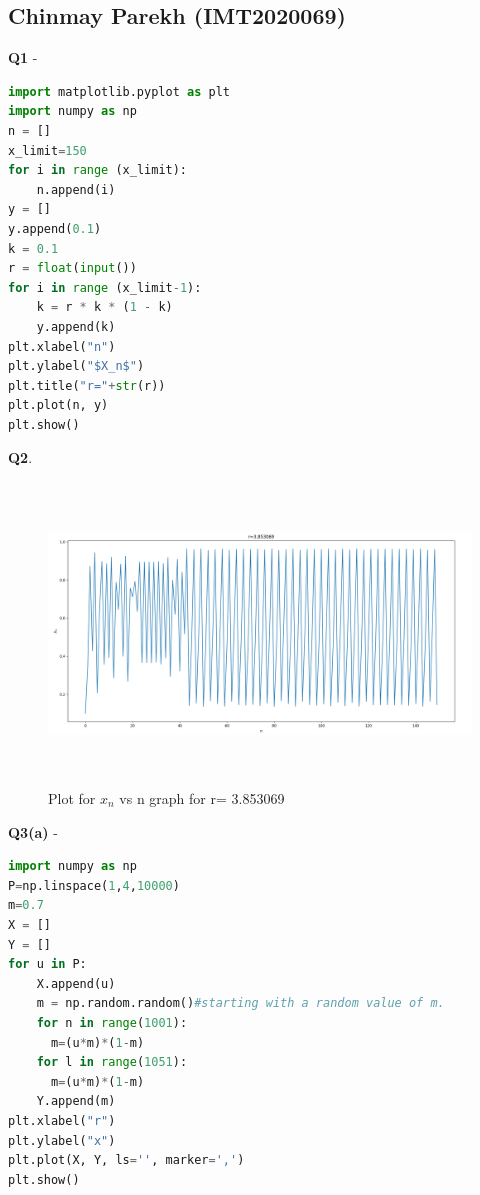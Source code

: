 \documentclass[11pt]{scrartcl} %
\begin{document}
\subsection{Chinmay Parekh (IMT2020069)}
\textbf{Q1} -
\begin{lstlisting}[language=Python, caption= Code for plotting $X_n$ vs n graph for a given r]
import matplotlib.pyplot as plt
import numpy as np
n = []
x_limit=150
for i in range (x_limit):
    n.append(i)
y = []
y.append(0.1)
k = 0.1
r = float(input())
for i in range (x_limit-1):
    k = r * k * (1 - k)
    y.append(k)
plt.xlabel("n")
plt.ylabel("$X_n$")
plt.title("r="+str(r))
plt.plot(n, y)
plt.show() 
\end{lstlisting}
\textbf{Q2}.
\begin{figure}[h] %
	\centering
	\includegraphics[width=12cm, height=8cm]{chinmay69.png} %
	\caption {Plot for $x_n$ vs n graph for r= 3.853069}
\end{figure}
\newpage
\textbf{Q3(a)} -
\begin{lstlisting}[language=Python, caption= Bifurcation diagram]
import numpy as np
P=np.linspace(1,4,10000)
m=0.7
X = []
Y = []
for u in P:
    X.append(u)
    m = np.random.random()#starting with a random value of m.
    for n in range(1001):
      m=(u*m)*(1-m)
    for l in range(1051):
      m=(u*m)*(1-m)
    Y.append(m)
plt.xlabel("r")
plt.ylabel("x")
plt.plot(X, Y, ls='', marker=',')
plt.show()
\end{lstlisting}
\newpage
\end{document}
